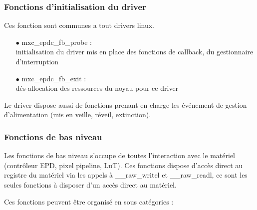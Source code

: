 \subsubsection{Fonctions d'initialisation du driver} %

	Ces fonction sont communes a tout drivers linux.
	\begin{itemize}
		\item[$\bullet$] mxc\_epdc\_fb\_probe : \\
		initialisation du driver mis en place des fonctions de callback, du gestionnaire d'interruption
		\item[$\bullet$] mxc\_epdc\_fb\_exit :\\
		dés-allocation des ressources du noyau pour ce driver
	\end{itemize}
	Le driver dispose aussi de fonctions prenant en charge les événement de gestion d'alimentation (mis en veille, réveil, extinction).
	
\subsubsection{Fonctions de bas niveau}

Les fonctions de bas niveau s'occupe de toutes l'interaction avec le matériel (contrôleur EPD, pixel pipeline, LuT).
Ces fonctions dispose d'accès direct au registre du matériel via les appels à \_\_raw\_writel et \_\_raw\_readl, ce sont les seules fonctions à disposer d'un accès direct au matériel.


Ces fonctions peuvent être organisé en  sous catégories : 


